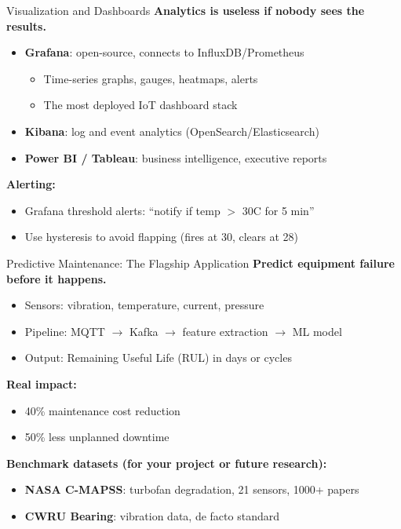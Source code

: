 \documentclass[aspectratio=169,11pt]{beamer}
\begin{document}
\begin{frame}{Visualization and Dashboards}
    \textbf{Analytics is useless if nobody sees the results.}

    \vspace{0.3cm}
    \begin{itemize}
        \item \textbf{Grafana}: open-source, connects to InfluxDB/Prometheus
        \begin{itemize}
            \item Time-series graphs, gauges, heatmaps, alerts
            \item The most deployed IoT dashboard stack
        \end{itemize}
        \item \textbf{Kibana}: log and event analytics (OpenSearch/Elasticsearch)
        \item \textbf{Power BI / Tableau}: business intelligence, executive reports
    \end{itemize}

    \vspace{0.3cm}
    \textbf{Alerting:}
    \begin{itemize}
        \item Grafana threshold alerts: ``notify if temp $>$ 30\textdegree C for 5 min''
        \item Use hysteresis to avoid flapping (fires at 30, clears at 28)
    \end{itemize}
\end{frame}

\begin{frame}{Predictive Maintenance: The Flagship Application}
    \textbf{Predict equipment failure before it happens.}

    \vspace{0.3cm}
    \begin{itemize}
        \item Sensors: vibration, temperature, current, pressure
        \item Pipeline: MQTT $\rightarrow$ Kafka $\rightarrow$ feature extraction $\rightarrow$ ML model
        \item Output: Remaining Useful Life (RUL) in days or cycles
    \end{itemize}

    \vspace{0.3cm}
    \textbf{Real impact:}
    \begin{itemize}
        \item 40\% maintenance cost reduction
        \item 50\% less unplanned downtime
    \end{itemize}

    \vspace{0.3cm}
    \textbf{Benchmark datasets (for your project or future research):}
    \begin{itemize}
        \item \textbf{NASA C-MAPSS}: turbofan degradation, 21 sensors, 1000+ papers
        \item \textbf{CWRU Bearing}: vibration data, de facto standard
    \end{itemize}
\end{frame}
\end{document}
